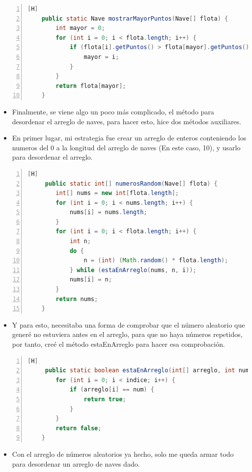 \documentclass{article}
\begin{document}
	\begin{lstlisting}[language=java,caption={Mostrar la nave con mayor cantidad de puntos}, numbers=left][H]
	public static Nave mostrarMayorPuntos(Nave[] flota) {
        int mayor = 0;
        for (int i = 0; i < flota.length; i++) {
            if (flota[i].getPuntos() > flota[mayor].getPuntos()) {
                mayor = i;
            }
        }
        return flota[mayor];
    }
	\end{lstlisting}	
	\begin{itemize}	
		\item Finalmente, se viene algo un poco más complicado, el método para desordenar el arreglo de naves, para hacer esto, hice dos métodos auxiliares.
		\item En primer lugar, mi estrategia fue crear un arreglo de enteros conteniendo los numeros del 0 a la longitud del arreglo de naves (En este caso, 10), y usarlo para desordenar el arreglo.
	\end{itemize}
	\begin{lstlisting}[language=java,caption={Método para obtener números desordenados}, numbers=left][H]
	 public static int[] numerosRandom(Nave[] flota) {
        int[] nums = new int[flota.length];
        for (int i = 0; i < nums.length; i++) {
            nums[i] = nums.length;
        }
        for (int i = 0; i < flota.length; i++) {
            int n;
            do {
                n = (int) (Math.random() * flota.length);
            } while (estaEnArreglo(nums, n, i));
            nums[i] = n;
        }
        return nums;
    }
	\end{lstlisting}
	\begin{itemize}	
		\item Y para esto, necesitaba una forma de comprobar que el número aleatorio que generé no estuviera antes en el arreglo, para que no haya números repetidos, por tanto, creé el método estaEnArreglo para hacer esa comprobación.
	\end{itemize}
	\begin{lstlisting}[language=java,caption={Método está en Arreglo}, numbers=left][H]
	 public static boolean estaEnArreglo(int[] arreglo, int num, int indice) {
        for (int i = 0; i < indice; i++) {
            if (arreglo[i] == num) {
                return true;
            }
        }
        return false;
    }
	\end{lstlisting}
	\begin{itemize}	
		\item Con el arreglo de números aleatorios ya hecho, solo me queda armar todo para desordenar un arreglo de naves dado.
	\end{itemize}
\end{document}
